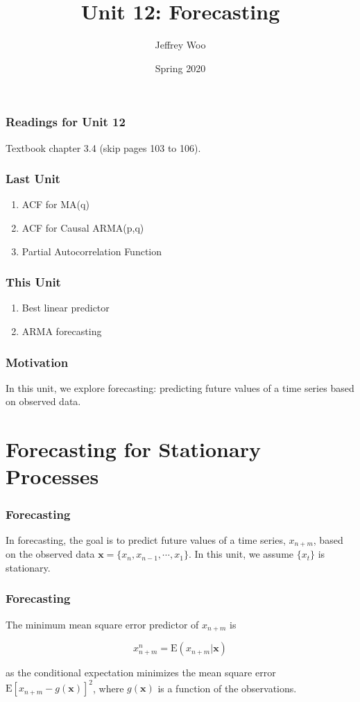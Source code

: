 \documentclass[%
xcolor=pdftex]{beamer}
\title{Unit 12: Forecasting}
\author[STAT 5170: Applied Time Series, Unit 12]{Jeffrey Woo}
\institute{Department of Statistics, University of Virginia}
\date{Spring 2020} %
\begin{document}
\frame{\titlepage}


\begin{frame}
\frametitle{Readings for Unit 12}

Textbook chapter 3.4 (skip pages 103 to 106).

\end{frame}



\begin{frame}
\frametitle{Last Unit}
\begin{enumerate}
\item ACF for MA(q)
\item ACF for Causal ARMA(p,q)
\item Partial Autocorrelation Function
\end{enumerate}
\end{frame}

\begin{frame}
\frametitle{This Unit}
\begin{enumerate}
\item Best linear predictor
\item ARMA forecasting
\end{enumerate}
\end{frame}

\begin{frame}
\frametitle{Motivation}

In this unit, we explore forecasting: predicting future values of a time series based on observed data.

\end{frame}

\section{Forecasting for Stationary Processes}
\frame{\tableofcontents[currentsection]}

\begin{frame}
\frametitle{Forecasting}

In forecasting, the goal is to predict future values of a time series, $x_{n+m}$, based on the observed data $\mathbf{x} = \{x_n, x_{n-1}, \cdots, x_1 \}$. In this unit, we assume $\{x_t\}$ is stationary.

\end{frame}

\begin{frame}
\frametitle{Forecasting}

The minimum mean square error predictor of $x_{n+m}$ is

\begin{equation}
x_{n+m}^n = \mbox{E}(x_{n+m} | \mathbf{x})
\end{equation}

as the conditional expectation minimizes the mean square error $\mbox{E}\left[x_{n+m} - g(\mathbf{x}) \right]^2$, where $g(\mathbf{x})$ is a function of the observations.

\end{frame}
\end{document}
